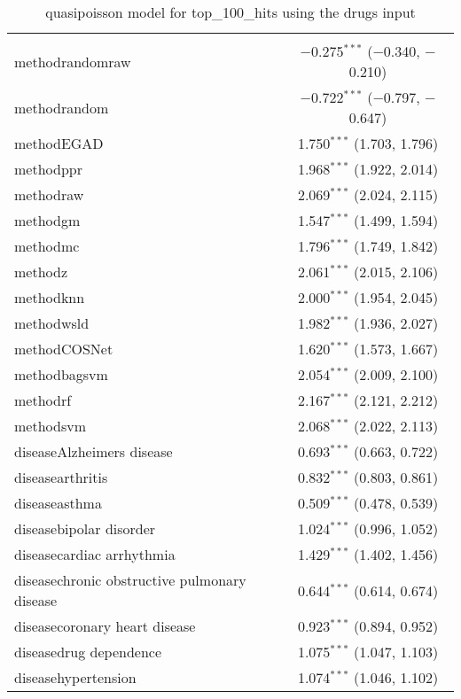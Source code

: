 
\begin{table}[!htbp] \centering 
  \caption{quasipoisson model for top_100_hits using the drugs input} 
  \label{} 
\begin{tabular}{@{\extracolsep{5pt}}lc} 
\\[-1.8ex]\hline 
\hline \\[-1.8ex] 
 methodrandomraw & $-$0.275$^{***}$ ($-$0.340, $-$0.210) \\ 
  methodrandom & $-$0.722$^{***}$ ($-$0.797, $-$0.647) \\ 
  methodEGAD & 1.750$^{***}$ (1.703, 1.796) \\ 
  methodppr & 1.968$^{***}$ (1.922, 2.014) \\ 
  methodraw & 2.069$^{***}$ (2.024, 2.115) \\ 
  methodgm & 1.547$^{***}$ (1.499, 1.594) \\ 
  methodmc & 1.796$^{***}$ (1.749, 1.842) \\ 
  methodz & 2.061$^{***}$ (2.015, 2.106) \\ 
  methodknn & 2.000$^{***}$ (1.954, 2.045) \\ 
  methodwsld & 1.982$^{***}$ (1.936, 2.027) \\ 
  methodCOSNet & 1.620$^{***}$ (1.573, 1.667) \\ 
  methodbagsvm & 2.054$^{***}$ (2.009, 2.100) \\ 
  methodrf & 2.167$^{***}$ (2.121, 2.212) \\ 
  methodsvm & 2.068$^{***}$ (2.022, 2.113) \\ 
  diseaseAlzheimers disease & 0.693$^{***}$ (0.663, 0.722) \\ 
  diseasearthritis & 0.832$^{***}$ (0.803, 0.861) \\ 
  diseaseasthma & 0.509$^{***}$ (0.478, 0.539) \\ 
  diseasebipolar disorder & 1.024$^{***}$ (0.996, 1.052) \\ 
  diseasecardiac arrhythmia & 1.429$^{***}$ (1.402, 1.456) \\ 
  diseasechronic obstructive pulmonary disease & 0.644$^{***}$ (0.614, 0.674) \\ 
  diseasecoronary heart disease & 0.923$^{***}$ (0.894, 0.952) \\ 
  diseasedrug dependence & 1.075$^{***}$ (1.047, 1.103) \\ 
  diseasehypertension & 1.074$^{***}$ (1.046, 1.102) \\ 

\end{tabular}
\end{table}
